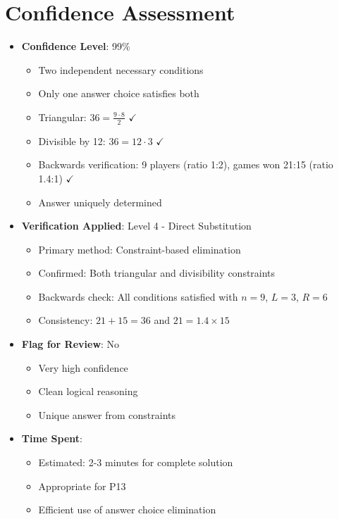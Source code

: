 \documentclass[12pt]{article}
\begin{document}
\section*{Confidence Assessment}
\begin{itemize}[leftmargin=*]
    \item \textbf{Confidence Level}: 99\% 
    \begin{itemize}
        \item Two independent necessary conditions
        \item Only one answer choice satisfies both
        \item Triangular: $36 = \frac{9 \cdot 8}{2}$ $\checkmark$
        \item Divisible by 12: $36 = 12 \cdot 3$ $\checkmark$
        \item Backwards verification: 9 players (ratio 1:2), games won 21:15 (ratio 1.4:1) $\checkmark$
        \item Answer uniquely determined
    \end{itemize}
    \item \textbf{Verification Applied}: Level 4 - Direct Substitution
    \begin{itemize}
        \item Primary method: Constraint-based elimination
        \item Confirmed: Both triangular and divisibility constraints
        \item Backwards check: All conditions satisfied with $n=9$, $L=3$, $R=6$
        \item Consistency: $21 + 15 = 36$ and $21 = 1.4 \times 15$
    \end{itemize}
    \item \textbf{Flag for Review}: No
    \begin{itemize}
        \item Very high confidence
        \item Clean logical reasoning
        \item Unique answer from constraints
    \end{itemize}
    \item \textbf{Time Spent}: 
    \begin{itemize}
        \item Estimated: 2-3 minutes for complete solution
        \item Appropriate for P13
        \item Efficient use of answer choice elimination
    \end{itemize}
\end{itemize}
\end{document}

